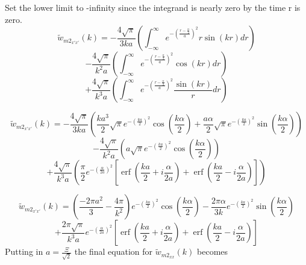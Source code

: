 \documentclass[double,12pt]{beavtex}
\begin{document}
Set the lower limit to -infinity since the integrand is nearly zero by the time r is zero. 
\begin{displaymath}{\widetilde{w}_{{m2}_{x'x'}}(k)=-\frac{4\sqrt{\pi}}{3ka}\left(\int_{-\infty}^{\infty}e^{-\left(\frac{r-\frac{\alpha}{2}}{a}\right)^2}r\sin(kr)d{r}\right)}\end{displaymath} 
\begin{displaymath}{-\frac{4\sqrt{\pi}}{k^2a}\left(\int_{-\infty}^{\infty}e^{-\left(\frac{r-\frac{\alpha}{2}}{a}\right)^2}\cos(kr)d{r}\right)}\end{displaymath} 
\begin{equation}{+\frac{4\sqrt{\pi}}{k^3a}\left(\int_{-\infty}^{\infty}e^{-\left(\frac{r-\frac{\alpha}{2}}{a}\right)^2}\frac{\sin(kr)}{r}d{r}\right)}\end{equation} 

\begin{displaymath}{\widetilde{w}_{{m2}_{x'x'}}(k)=-\frac{4\sqrt{\pi}}{3ka}\left(\frac{ka^3}{2}\sqrt{\pi}e^{-\left(\frac{ka}{2}\right)^2}\cos(\frac{k\alpha}{2})+\frac{a\alpha}{2}\sqrt{\pi}e^{-\left(\frac{ka}{2}\right)^2}\sin(\frac{k\alpha}{2})\right)}\end{displaymath} 
\begin{displaymath}{-\frac{4\sqrt{\pi}}{k^2a}\left(a\sqrt{\pi}e^{-\left(\frac{ka}{2}\right)^2}\cos(\frac{k\alpha}{2})\right)}\end{displaymath} 
\begin{equation}{+\frac{4\sqrt{\pi}}{k^3a}\left(\frac{\pi}{2}e^{-\left(\frac{\alpha}{2a}\right)^2}\left[\operatorname{erf}\left(\frac{ka}{2}+i\frac{\alpha}{2a}\right)+\operatorname{erf}\left(\frac{ka}{2}-i\frac{\alpha}{2a}\right)\right]\right)}\end{equation} 

\begin{displaymath}{\widetilde{w}_{{m2}_{x'x'}}(k)=\left(\frac{-2\pi{a}^2}{3}-\frac{4\pi}{k^2}\right)e^{-\left(\frac{ka}{2}\right)^2}\cos(\frac{k\alpha}{2})-\frac{2\pi\alpha}{3k}e^{-\left(\frac{ka}{2}\right)^2}\sin(\frac{k\alpha}{2})}\end{displaymath} 
\begin{equation}{+\frac{2\pi\sqrt{\pi}}{k^3a}e^{-\left(\frac{\alpha}{2a}\right)^2}\left[\operatorname{erf}\left(\frac{ka}{2}+i\frac{\alpha}{2a}\right)+\operatorname{erf}\left(\frac{ka}{2}-i\frac{\alpha}{2a}\right)\right]}\end{equation} 
Putting in $a=\frac{\Xi}{\sqrt{2}}$ the final equation for $\widetilde{w}_{{m2}_{xx}}(k)$ becomes
\end{document}
